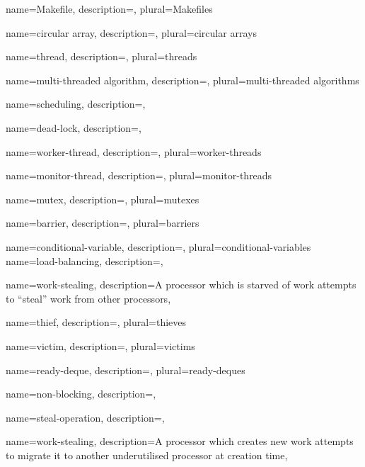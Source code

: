 {
    name={Makefile},
    description={},
    plural={Makefiles}
}

{
    name={circular array},
    description={},
    plural={circular arrays}
}

{
    name={thread},
    description={},
    plural={threads}
}

{
    name={multi-threaded algorithm},
    description={},
    plural={multi-threaded algorithms}
}

{
    name={scheduling},
    description={},    
}

{
    name={dead-lock},
    description={},    
}

{
    name={worker-thread},
    description={},
    plural={worker-threads}
}

{
    name={monitor-thread},
    description={},
    plural={monitor-threads}
}

{
    name={mutex},
    description={},
    plural={mutexes}
}

{
    name={barrier},
    description={},
    plural={barriers}
}

{
    name={conditional-variable},
    description={},
    plural={conditional-variables}
}
{
    name={load-balancing},
    description={},
}

{
    name={work-stealing},
    description={A processor which is starved of work attempts to ``steal'' 
                 work from other processors},
}

{
    name={thief},
    description={},
    plural={thieves}
}

{
    name={victim},
    description={},
    plural={victims}
}

{
    name={ready-deque},
    description={},
    plural={ready-deques}
}

{
    name={non-blocking},
    description={},
}

{
    name={steal-operation},
    description={},
}

{
    name={work-stealing},
    description={A processor which creates new work attempts to migrate it to 
                 another underutilised processor at creation time},
}

